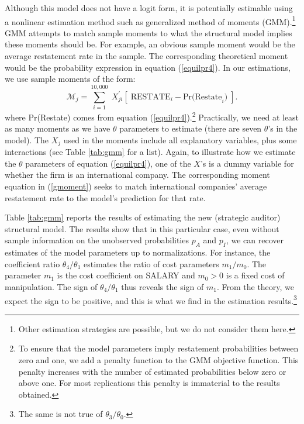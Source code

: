 \documentclass[12pt,reqno,titlepage]{amsart}
\theoremstyle{definition}
\begin{document}
\begin{doublespace}
Although this model does not have a logit form, it is potentially estimable using a nonlinear estimation method such as generalized method of moments (GMM).\footnote{
Other estimation strategies are possible, but we do not consider them here.}
GMM attempts to match sample moments to what the structural model implies 
these moments should be. 
For example, an obvious sample moment would be the average restatement rate in the sample.
The corresponding theoretical moment would be the probability expression in equation (\ref{equilpr4}).
In our estimations, we use sample moments of the form:
\begin{equation}\label{gmoment}
\mathcal{M}_j = \sum_{i=1}^{10,000} \; X_{ji}^\prime \left[ \; \mbox{RESTATE}_{i} - \mbox{Pr(Restate}_i\mbox{)} \; \right]. 
\end{equation}
where Pr(Restate) comes from equation (\ref{equilpr4}).\footnote{
To ensure that the model parameters imply restatement probabilities between zero and one, we add a penalty function to the GMM objective function.
This penalty increases with the number of estimated probabilities below zero or above one.
For most replications this penalty is immaterial to the results obtained.}
Practically, we need at least as many moments as we have $\theta$ parameters to estimate (there are seven $\theta$'s in the model).
The $X_j$ used in the moments include all explanatory variables,
plus some interactions (see Table \ref{tab:gmm} for a list).
Again, to illustrate how we estimate the $\theta$ parameters of equation (\ref{equilpr4}), one of the $X$'s is a dummy variable for whether the firm is an international company. The corresponding moment equation in (\ref{gmoment}) seeks to match international companies' average restatement rate to the model's prediction for that rate.

Table \ref{tab:gmm} reports the results of estimating the new (strategic auditor) structural model. 
The results show that in this particular case, even without sample information on the unobserved probabilities $p_A$ and $p_I$, we can recover estimates of the model parameters up to normalizations.
For instance, the coefficient ratio $\theta_4/\theta_1$ estimates the ratio of cost parameters $m_1/m_0$.
The parameter $m_1$ is the cost coefficient on SALARY and 
$m_0 > 0$ is a fixed cost of manipulation. The sign of $\theta_4/\theta_1$ thus reveals the sign of $m_1$.
From the theory, we expect the sign to be positive, and this is what we find in the estimation results.\footnote{The same is not true of $\theta_3/\theta_0$.}


\end{doublespace}
\end{document}
